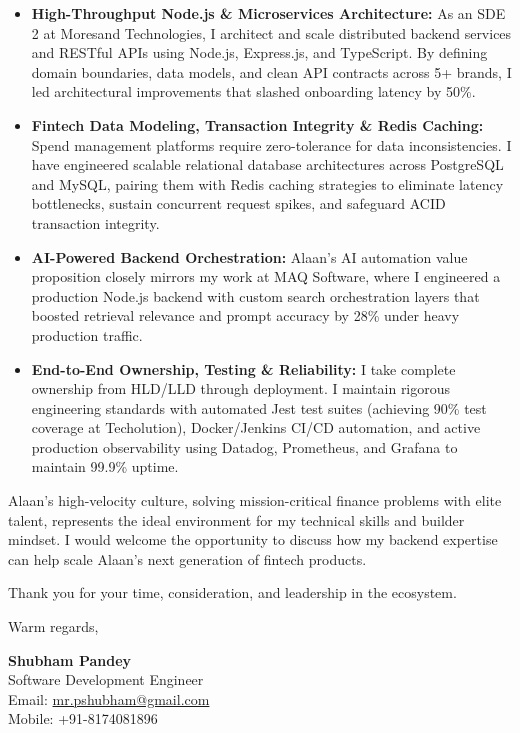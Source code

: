 \documentclass[a4paper,10pt]{article}
\begin{document}
\begin{itemize}[leftmargin=12pt, itemsep=3pt, parsep=0pt]
  \item \textbf{High-Throughput Node.js \& Microservices Architecture:} As an SDE 2 at Moresand Technologies, I architect and scale distributed backend services and RESTful APIs using Node.js, Express.js, and TypeScript. By defining domain boundaries, data models, and clean API contracts across 5+ brands, I led architectural improvements that slashed onboarding latency by 50\%.
  \item \textbf{Fintech Data Modeling, Transaction Integrity \& Redis Caching:} Spend management platforms require zero-tolerance for data inconsistencies. I have engineered scalable relational database architectures across PostgreSQL and MySQL, pairing them with Redis caching strategies to eliminate latency bottlenecks, sustain concurrent request spikes, and safeguard ACID transaction integrity.
  \item \textbf{AI-Powered Backend Orchestration:} Alaan's AI automation value proposition closely mirrors my work at MAQ Software, where I engineered a production Node.js backend with custom search orchestration layers that boosted retrieval relevance and prompt accuracy by 28\% under heavy production traffic.
  \item \textbf{End-to-End Ownership, Testing \& Reliability:} I take complete ownership from HLD/LLD through deployment. I maintain rigorous engineering standards with automated Jest test suites (achieving 90\% test coverage at Techolution), Docker/Jenkins CI/CD automation, and active production observability using Datadog, Prometheus, and Grafana to maintain 99.9\% uptime.
\end{itemize}

\vspace{6pt}
Alaan's high-velocity culture, solving mission-critical finance problems with elite talent, represents the ideal environment for my technical skills and builder mindset. I would welcome the opportunity to discuss how my backend expertise can help scale Alaan's next generation of fintech products.

\vspace{6pt}
Thank you for your time, consideration, and leadership in the ecosystem.

\vspace{12pt}
Warm regards,

\vspace{6pt}
\textbf{Shubham Pandey} \\
Software Development Engineer \\
Email: \href{mailto:mr.pshubham@gmail.com}{mr.pshubham@gmail.com} \\
Mobile: +91-8174081896
\end{document}
